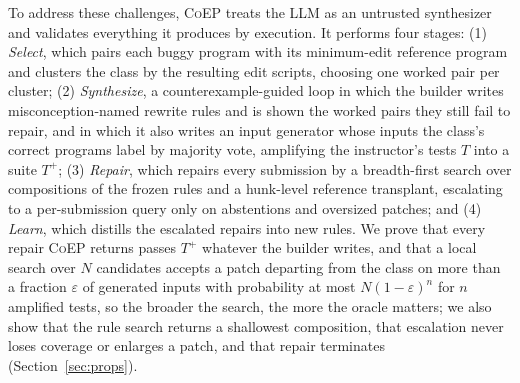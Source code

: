 \documentclass[acmsmall,screen,review,anonymous,nonacm]{acmart}
\newcommand{\tool}{\textsc{CoEP}\xspace}
\begin{document}
To address these challenges, \tool treats the LLM as an untrusted synthesizer and validates everything it produces by execution. It performs four stages: (1) \emph{Select}, which pairs each buggy program with its minimum-edit reference program and clusters the class by the resulting edit scripts, choosing one worked pair per cluster; (2) \emph{Synthesize}, a counterexample-guided loop in which the builder writes misconception-named rewrite rules and is shown the worked pairs they still fail to repair, and in which it also writes an input generator whose inputs the class's correct programs label by majority vote, amplifying the instructor's tests $T$ into a suite $T^{+}$; (3) \emph{Repair}, which repairs every submission by a breadth-first search over compositions of the frozen rules and a hunk-level reference transplant, escalating to a per-submission query only on abstentions and oversized patches; and (4) \emph{Learn}, which distills the escalated repairs into new rules. We prove that every repair \tool returns passes $T^{+}$ whatever the builder writes, and that a local search over $N$ candidates accepts a patch departing from the class on more than a fraction $\varepsilon$ of generated inputs with probability at most $N(1 - \varepsilon)^{n}$ for $n$ amplified tests, so the broader the search, the more the oracle matters; we also show that the rule search returns a shallowest composition, that escalation never loses coverage or enlarges a patch, and that repair terminates (Section~\ref{sec:props}).
\end{document}

